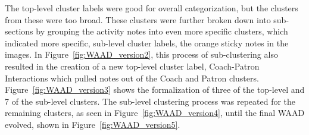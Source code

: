 \documentclass[12pt]{article} %
\begin{document}
  The top-level cluster labels were good for overall categorization, but the clusters from these were too broad.
  These clusters were further broken down into sub-sections by grouping the activity notes into even more specific clusters, which indicated more specific, sub-level cluster labels, the orange sticky notes in the images.
  In Figure~\ref{fig:WAAD_version2}, this process of sub-clustering also resulted in the creation of a new top-level cluster label, Coach-Patron Interactions which pulled notes out of the Coach and Patron clusters.
  Figure~\ref{fig:WAAD_version3} shows the formalization of three of the top-level and 7 of the sub-level clusters.
  The sub-level clustering process was repeated for the remaining clusters, as seen in Figure~\ref{fig:WAAD_version4}, until the final WAAD evolved, shown in Figure~\ref{fig:WAAD_version5}.
\end{document}
